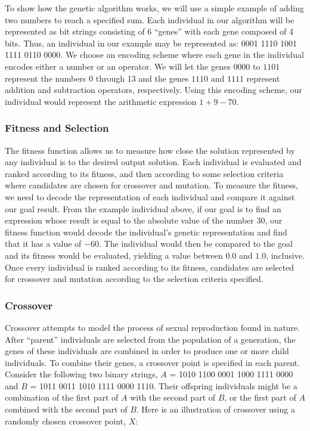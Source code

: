 To show how the genetic algorithm works, we will use a simple example of adding two numbers to reach a specified sum. Each individual in our algorithm will be represented as bit strings consisting of 6 ``genes'' with each gene composed of 4
bits. Thus, an individual in our example may be represented as: 0001 1110 1001 1111 0110 0000. We choose an
encoding scheme where each gene in the individual encodes either a number or an operator. We will let the genes $0000$ to 
$1101$ represent the numbers 0 through 13 and the genes $1110$ and $1111$ represent addition and subtraction operators, respectively. Using 
this encoding scheme, our individual would represent the arithmetic expression $1 + 9 - 70$.

\subsubsection{Fitness and Selection}
The fitness function allows us to measure how close the solution represented by any individual is to the desired output solution. Each individual is evaluated and ranked according to its fitness, and then according to some selection 
criteria where candidates are chosen for crossover and mutation. To measure the fitness, we need to decode the representation of each 
individual and compare it against our goal result. From the example individual above, if our goal is to find an expression 
whose result is equal to the absolute value of the number $30$, our fitness function would decode the individual's genetic representation and find that 
it has a value of $-60$. The individual would then be compared to the goal and its fitness would be evaluated, yielding a value between $0.0$ and $1.0$, inclusive. Once every individual is ranked according 
to its fitness, candidates are selected for crossover and mutation according to the selection criteria specified.


\subsubsection{Crossover}
Crossover attempts to model the process of sexual reproduction found in nature. After ``parent'' individuals are selected from the population of a generation, the genes of these individuals are combined in order to produce one or more child individuals. To 
combine their genes, a crossover point is specified in each parent. Consider the following two binary strings, $A$ = 1010 1100 0001 1000 1111 0000 
and $B$ = 1011 0011 1010 1111 0000 1110. Their offspring individuals might be a combination of the first part of $A$ with the second part of $B$, 
or the first part of $A$ combined with the second part of $B$. Here is an illustration of crossover using a randomly chosen crossover point, $X$:

